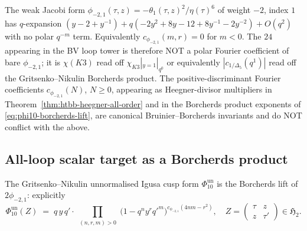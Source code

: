 \begin{remark}
\label{rem:phi-weak-jacobi-holomorphic}
The weak Jacobi form
$\phi_{-2,1}(\tau,z) = -\theta_1(\tau,z)^{2}/\eta(\tau)^{6}$
of weight $-2$, index $1$
\cite[\S 9, Theorem 9.3]{EichlerZagier1985} has $q$-expansion
$(y - 2 + y^{-1}) + q(-2y^{2}+8y-12+8y^{-1}-2y^{-2})+O(q^{2})$
with no polar $q^{-m}$ term. Equivalently
$c_{\phi_{-2,1}}(m,r) = 0$ for $m < 0$. The $24$ appearing in the
BV loop tower is therefore NOT a polar Fourier coefficient of bare
$\phi_{-2,1}$; it is $\chi(K3)$ read off $\chi_{K3}|_{y=1}|_{q^{0}}$
or equivalently $|c_{1/\Delta_{5}}(q^{1})|$ read off the
Gritsenko--Nikulin Borcherds product. The positive-discriminant
Fourier coefficients $c_{\phi_{-2,1}}(N)$, $N\ge 0$, appearing as
Heegner-divisor multipliers in
Theorem~\ref{thm:htbb-heegner-all-order} and in the Borcherds product
exponents of \eqref{eq:phi10-borcherds-lift}, are canonical
Bruinier--Borcherds invariants and do NOT conflict with the above.
\end{remark}

\subsection{All-loop scalar target as a Borcherds product}
\label{subsec:hcs-borcherds}

The Gritsenko--Nikulin unnormalised Igusa cusp form
$\Phi_{10}^{\mathrm{un}}$ is the Borcherds lift
of $2\phi_{-2,1}$: explicitly
\begin{equation}\label{eq:phi10-borcherds-lift}
 \Phi_{10}^{\mathrm{un}}(Z)
 \;=\;
 q\,y\,q'\cdot
 \prod_{\substack{(n,r,m)>0}}
 \bigl(1 - q^{n}y^{r}q'^{m}\bigr)^{c_{\phi_{-2,1}}(4nm - r^{2})},
 \quad
 Z = \begin{pmatrix}\tau & z \\ z & \tau'\end{pmatrix}\in\mathfrak{H}_{2}.
\end{equation}

